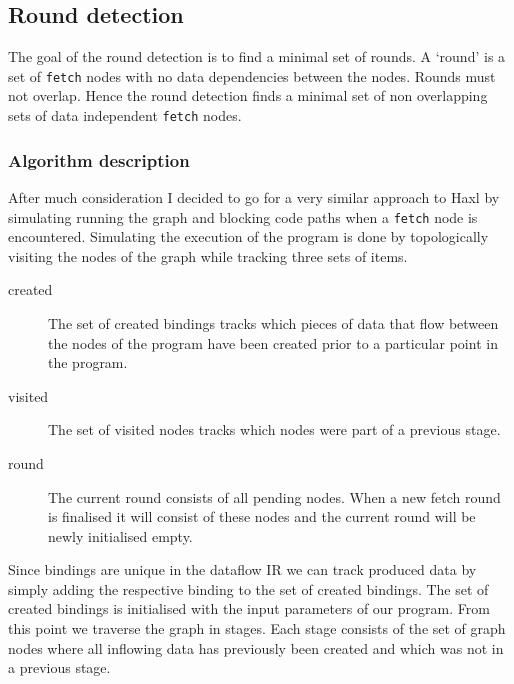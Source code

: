 \subsection{Round detection}

The goal of the round detection is to find a minimal set of rounds.
A `round' is a set of \texttt{fetch} nodes with no data dependencies between the nodes.
Rounds must not overlap.
Hence the round detection finds a minimal set of non overlapping sets of data independent \texttt{fetch} nodes.

\subsubsection{Algorithm description}

After much consideration I decided to go for a very similar approach to Haxl by simulating running the graph and blocking code paths when a \texttt{fetch} node is encountered.
Simulating the execution of the program is done by topologically visiting the nodes of the graph while tracking three sets of items.

\begin{description}
	\item[created] The set of created bindings tracks which pieces of data that flow between the nodes of the program have been created prior to a particular point in the program.
	\item[visited] The set of visited nodes tracks which nodes were part of a previous stage.
	\item[round] The current round consists of all pending \fetch{} nodes.
	When a new fetch round is finalised it will consist of these \fetch{} nodes and the current round will be newly initialised empty.
\end{description}

Since bindings are unique in the dataflow IR we can track produced data by simply adding the respective binding to the set of created bindings.
The set of created bindings is initialised with the input parameters of our program.
From this point we traverse the graph in stages.
Each stage consists of the set of graph nodes where all inflowing data has previously been created and which was not in a previous stage.

